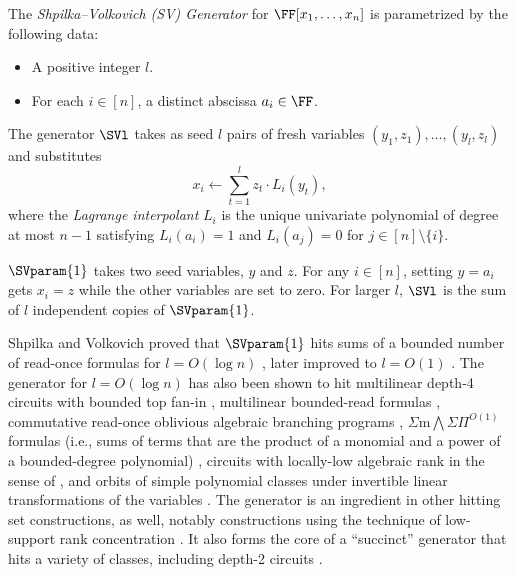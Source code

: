 \documentclass{toc}
\begin{document}
\begin{definition}[SV generator]
    \label{def.sv}
    The \emph{Shpilka--Volkovich (SV) Generator} for \(\FF[x_1,\dots,x_n]\) is paramet\-rized by the following data:    %
    \begin{itemize}
        \item A positive integer \(l\).
        \item For each \(i \in [n]\), a distinct abscissa \(a_i\in \FF\).
    \end{itemize}
    The generator \(\SVl\) takes as seed \(l\) pairs of fresh variables
    \((y_1,z_1),\ldots,(y_l,z_l)\) and substitutes
    \begin{equation}\label{eq-sv-sub}
    x_i\gets\sum_{t=1}^l  z_t \cdot L_i(y_t),
    \end{equation}
    where the \emph{Lagrange interpolant} $L_i$ is the unique univariate polynomial of degree at most $n-1$ satisfying $L_i(a_i)=1$ and $L_i(a_j) = 0$ for $j \in [n] \setminus \{i\}$.
\end{definition}
$\SVparam{1}$ takes two seed variables, $y$ and $z$. For any $i \in [n]$, setting $y=a_i$ gets $x_i=z$ while the other variables are set to zero. For larger $l$, $\SVl$ is the sum of $l$ independent copies of $\SVparam{1}$. 

Shpilka and Volkovich proved that $\SVparam{1}$ hits sums of a bounded number of read-once formulas for
$l=O(\log n)$ \cite{ShpilkaVolkovich2008}, later improved to $l=O(1)$ \cite{MinahanVolkovich2017}.
The generator for $l=O(\log n)$ has also been shown to hit multilinear
depth-4 circuits with bounded top fan-in \cite{KMSV2009},
multilinear bounded-read formulas \cite{AvMV2011},
commutative read-once oblivious algebraic branching programs \cite{FSS2014},
%
%
\(\Sigma\mathrm{m}\bigwedge\Sigma\Pi^{O(1)}\) formulas (i.e., sums of terms that are the product of a monomial and a power of a bounded-degree polynomial) \cite{Forbes2015},
circuits with locally-low algebraic rank in the sense of
\cite{KumarSaraf2016},
and orbits of simple polynomial classes under invertible linear
transformations of the variables \cite{MediniShpilka2021}.
The generator is an ingredient in other hitting set constructions, as well,
notably constructions using the technique of low-support rank concentration
\cite{ASS2013,AGKS2014,GKST2015,GKS2016,SahaThankey2021,BhargavaGhosh2021}.
It also forms the core of a ``succinct'' generator that hits a variety of
classes, including depth-2 circuits \cite{FSV2018}.
\end{document}
